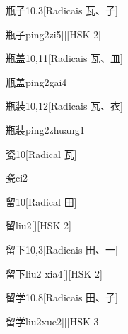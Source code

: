 \begin{entry}{瓶子}{10,3}[Radicais ⽡、⼦]
  \begin{phonetics}{瓶子}{ping2zi5}[][HSK 2]
  \end{phonetics}
\end{entry}

\begin{entry}{瓶盖}{10,11}[Radicais ⽡、⽫]
  \begin{phonetics}{瓶盖}{ping2gai4}
  \end{phonetics}
\end{entry}

\begin{entry}{瓶装}{10,12}[Radicais ⽡、⾐]
  \begin{phonetics}{瓶装}{ping2zhuang1}
  \end{phonetics}
\end{entry}

\begin{entry}{瓷}{10}[Radical ⽡]
  \begin{phonetics}{瓷}{ci2}
  \end{phonetics}
\end{entry}

\begin{entry}{留}{10}[Radical ⽥]
  \begin{phonetics}{留}{liu2}[][HSK 2]
  \end{phonetics}
\end{entry}

\begin{entry}{留下}{10,3}[Radicais ⽥、⼀]
  \begin{phonetics}{留下}{liu2 xia4}[][HSK 2]
  \end{phonetics}
\end{entry}

\begin{entry}{留学}{10,8}[Radicais ⽥、⼦]
  \begin{phonetics}{留学}{liu2xue2}[][HSK 3]
  \end{phonetics}
\end{entry}

